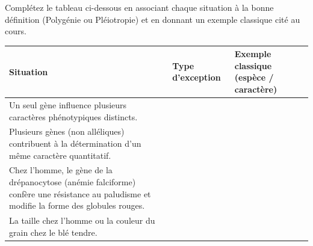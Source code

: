\documentclass[11pt]{article}
\begin{document}
\begin{exercice}
Complétez le tableau ci-dessous en associant chaque situation à la bonne définition (Polygénie ou Pléiotropie) et en donnant un exemple classique cité au cours.
\begin{center}
\begin{tabular}{|p{3.5cm}|p{5cm}|p{4.5cm}|}
\hline
\textbf{Situation} & \textbf{Type d'exception} & \textbf{Exemple classique (espèce / caractère)} \\
\hline
Un seul gène influence plusieurs caractères phénotypiques distincts. & & \\
\hline
Plusieurs gènes (non alléliques) contribuent à la détermination d'un même caractère quantitatif. & & \\
\hline
Chez l'homme, le gène de la drépanocytose (anémie falciforme) confère une résistance au paludisme et modifie la forme des globules rouges. & & \\
\hline
La taille chez l'homme ou la couleur du grain chez le blé tendre. & & \\
\hline
\end{tabular}
\end{center}
\end{exercice}
\end{document}
